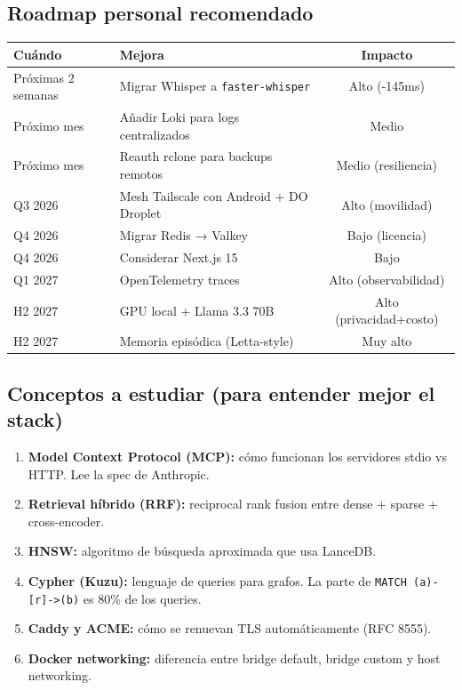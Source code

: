 \documentclass[11pt,a4paper]{article}
\begin{document}
\subsection{Roadmap personal recomendado}

\begin{center}
\begin{tabularx}{0.95\textwidth}{|l|X|c|}
\hline
\rowcolor{manualgreen}\color{white}\textbf{Cuándo} & \color{white}\textbf{Mejora} & \color{white}\textbf{Impacto}\\
\hline
Próximas 2 semanas & Migrar Whisper a \texttt{faster-whisper} & Alto (-145ms)\\
Próximo mes & Añadir Loki para logs centralizados & Medio\\
Próximo mes & Reauth rclone para backups remotos & Medio (resiliencia)\\
Q3 2026 & Mesh Tailscale con Android + DO Droplet & Alto (movilidad)\\
Q4 2026 & Migrar Redis → Valkey & Bajo (licencia)\\
Q4 2026 & Considerar Next.js 15 & Bajo\\
Q1 2027 & OpenTelemetry traces & Alto (observabilidad)\\
H2 2027 & GPU local + Llama 3.3 70B & Alto (privacidad+costo)\\
H2 2027 & Memoria episódica (Letta-style) & Muy alto\\
\hline
\end{tabularx}
\end{center}

\subsection{Conceptos a estudiar (para entender mejor el stack)}

\begin{enumerate}[leftmargin=*,itemsep=2pt]
\item \textbf{Model Context Protocol (MCP):} cómo funcionan los servidores stdio vs HTTP. Lee la spec de Anthropic.
\item \textbf{Retrieval híbrido (RRF):} reciprocal rank fusion entre dense + sparse + cross-encoder.
\item \textbf{HNSW:} algoritmo de búsqueda aproximada que usa LanceDB.
\item \textbf{Cypher (Kuzu):} lenguaje de queries para grafos. La parte de \texttt{MATCH (a)-[r]->(b)} es 80\% de los queries.
\item \textbf{Caddy y ACME:} cómo se renuevan TLS automáticamente (RFC 8555).
\item \textbf{Docker networking:} diferencia entre bridge default, bridge custom y host networking.
\end{enumerate}
\end{document}
